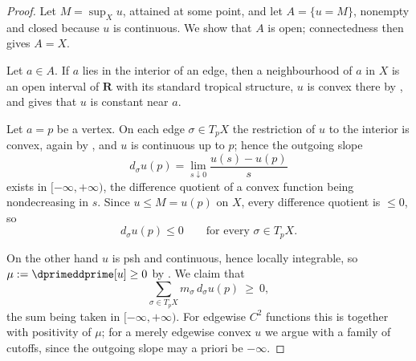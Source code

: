 \begin{proof}
Let $M=\sup_Xu$, attained at some point, and let $A=\{u=M\}$, nonempty and
closed because $u$ is continuous.  We show that $A$ is open; connectedness then gives
$A=X$.

Let $a\in A$.  If $a$ lies in the interior of an edge, then a neighbourhood
of $a$ in $X$ is an open interval of $\mathbf R$ with its standard tropical
structure, $u$ is convex there by , and
 gives that $u$ is constant near $a$.

Let $a=p$ be a vertex.  On each edge $\sigma\in T_pX$ the restriction of $u$
to the interior is convex, again by , and $u$
is continuous up to $p$; hence the outgoing slope
\[
 d_\sigma u(p)=\lim_{s\downarrow0}\frac{u(s)-u(p)}{s}
\]
exists in $[-\infty,+\infty)$, the difference quotient of a convex function
being nondecreasing in $s$.  Since $u\le M=u(p)$ on $X$, every difference
quotient is $\le0$, so
\begin{equation}
\label{eq:ch15-max-slopes}
 d_\sigma u(p)\le0\qquad\text{for every }\sigma\in T_pX .
\end{equation}

On the other hand $u$ is psh and continuous, hence locally integrable, so
$\mu:=\dprimeddprime[u]\ge0$ by .  We
claim that
\begin{equation}
\label{eq:ch15-max-atom}
 \sum_{\sigma\in T_pX}m_\sigma\,d_\sigma u(p)\ \ge\ 0 ,
\end{equation}
the sum being taken in $[-\infty,+\infty)$.  For edgewise $C^2$ functions
this is  together with positivity of $\mu$; for a
merely edgewise convex $u$ we argue with a family of cutoffs, since the
outgoing slope may a priori be $-\infty$.


\end{proof}

